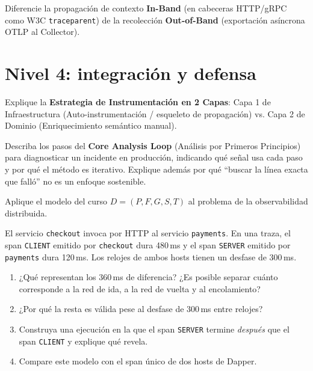 \documentclass[variant=guia,cover=institutional,mode=screen]{ua-engineering-v6-article}
\begin{document}
\begin{uaexercise}
Diferencie la propagación de contexto \textbf{In-Band} (en cabeceras HTTP/gRPC como W3C \texttt{traceparent}) de la recolección \textbf{Out-of-Band} (exportación asíncrona OTLP al Collector).
\end{uaexercise}


\section{Nivel 4: integración y defensa}
\begin{uaexercise}
Explique la \textbf{Estrategia de Instrumentación en 2 Capas}: Capa 1 de Infraestructura (Auto-instrumentación / esqueleto de propagación) vs. Capa 2 de Dominio (Enriquecimiento semántico manual).
\end{uaexercise}

\begin{uaexercise}
Describa los pasos del \textbf{Core Analysis Loop} (Análisis por Primeros Principios) para diagnosticar un incidente en producción, indicando qué señal usa cada paso y por qué el método es iterativo. Explique además por qué ``buscar la línea exacta que falló'' no es un enfoque sostenible.
\end{uaexercise}

\begin{uaexercise}
Aplique el modelo del curso $D=(P,F,G,S,T)$ al problema de la observabilidad distribuida.
\end{uaexercise}


\begin{uaexercise}
El servicio \texttt{checkout} invoca por HTTP al servicio \texttt{payments}. En una traza, el span \texttt{CLIENT} emitido por \texttt{checkout} dura 480\,ms y el span \texttt{SERVER} emitido por \texttt{payments} dura 120\,ms. Los relojes de ambos hosts tienen un desfase de 300\,ms.
\begin{enumerate}
\item ¿Qué representan los 360\,ms de diferencia? ¿Es posible separar cuánto corresponde a la red de ida, a la red de vuelta y al encolamiento?
\item ¿Por qué la resta es válida pese al desfase de 300\,ms entre relojes?
\item Construya una ejecución en la que el span \texttt{SERVER} termine \emph{después} que el span \texttt{CLIENT} y explique qué revela.
\item Compare este modelo con el span único de dos hosts de Dapper.
\end{enumerate}
\end{uaexercise}
\end{document}

